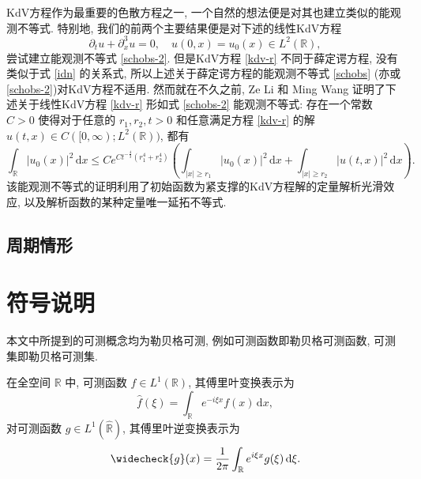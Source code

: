 \documentclass[master]{cugthesis}
\newcommand\R{\ensuremath{\mathbb{R}}}
\newcommand\Z{\ensuremath{\mathbb{Z}}}
\newcommand\T{\ensuremath{\mathbb{T}}}
\renewcommand\d{\ensuremath{\,\mathrm{d}}}
\begin{document}
    KdV方程作为最重要的色散方程之一,  一个自然的想法便是对其也建立类似的能观测不等式. 特别地, 我们的前两个主要结果便是对下述的线性KdV方程
    \begin{equation}
        \partial_t u+\partial_x^3 u=0,\quad u(0,x)=u_0(x)\in L^2(\R),\label{kdv-r}
    \end{equation} 
    尝试建立能观测不等式 \eqref{schobs-2}. 但是KdV方程 \eqref{kdv-r} 不同于薛定谔方程, 没有类似于式 \eqref{idn} 的关系式, 所以上述关于薛定谔方程的能观测不等式 \eqref{schobs} (亦或 \eqref{schobs-2})对KdV方程不适用. 然而就在不久之前, Ze Li 和 Ming Wang 证明了下述关于线性KdV方程 \eqref{kdv-r} 形如式 \eqref{schobs-2} 能观测不等式: 存在一个常数 $C>0$ 使得对于任意的 $r_1,r_2,t>0$ 和任意满足方程 \eqref{kdv-r} 的解 $u(t,x)\in C([0,\infty);L^2(\R))$, 都有
    \begin{equation}
        \int_{\R}|u_0(x)|^2\d x\le Ce^{Ct^{-\frac{4}{3}}\left(r_1^4+r_2^4\right)}\left(\int
        _{|x|\ge r_1}|u_0(x)|^2\d x+\int _{|x|\ge r_2}|u(t,x)|^2\d x\right).\label{kdvobs-1}
    \end{equation}
    该能观测不等式的证明利用了初始函数为紧支撑的KdV方程解的定量解析光滑效应, 以及解析函数的某种定量唯一延拓不等式.
   
   \subsection{周期情形}

    


    
    

    \iffalse 论文的第二部分考虑圆周 $\T:= \R / \Z$ 上的线性KdV方程.\cite{Ionescu2006UniquenessPO}
    \fi
    
    
    \section{符号说明}
    
    本文中所提到的可测概念均为勒贝格可测, 例如可测函数即勒贝格可测函数, 可测集即勒贝格可测集. 
    
    在全空间 $\R$ 中, 可测函数 $f\in L^1(\R)$, 其傅里叶变换表示为
    \begin{equation*}
        \widehat{f}(\xi)=\int_{\R} e^{-i\xi x} f(x)\d x,
    \end{equation*}
    对可测函数 $g\in L^1(\widehat{\R}) $, 其傅里叶逆变换表示为
    \begin{equation*}
        \widecheck{g}(x)=\frac{1}{2\pi}\int_{\R} e^{i\xi x} g(\xi) \d \xi.
    \end{equation*}
    
\end{document}
